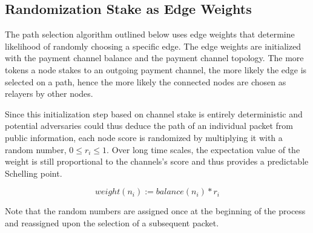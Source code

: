 \subsection{Randomization Stake as Edge Weights}
The path selection algorithm outlined below uses edge weights that determine likelihood of randomly choosing a specific edge. The edge weights are initialized with the payment channel balance and the payment channel topology. The more tokens a node stakes to an outgoing payment channel, the more likely the edge is selected on a path, hence the more likely the connected nodes are chosen as relayers by other nodes.

Since this initialization step based on channel stake is entirely deterministic and potential adversaries could thus deduce the path of an individual packet from public information, each node score is randomized by multiplying it with a random number, $0 \le r_i \le 1$. Over long time scales, the expectation value of the weight is still proportional to the channels's score and thus provides a predictable Schelling point.

$$ weight(n_i) := balance(n_i) * r_i$$

Note that the random numbers are assigned once at the beginning of the process and reassigned upon the selection of a subsequent packet.